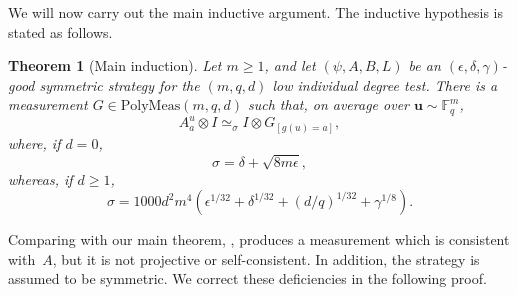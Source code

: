 \documentclass[11pt]{article}
\newtheorem{theorem}{Theorem}[section]
\theoremstyle{definition}
\newcommand{\F}{\mathbb F}
\newcommand{\eps}{\epsilon}
\newcommand{\bu}{\boldsymbol{u}}
\newcommand{\polymeas}[3]{\mathrm{PolyMeas}(#1, #2, #3)}
\begin{document}
We will now carry out the main inductive argument.
The inductive hypothesis is stated as follows.

\begin{theorem}[Main induction]\label{thm:main-induction}
Let $m\geq1$, and let $(\psi,A,B,L)$ be an $(\eps,\delta,\gamma)$-good symmetric strategy
for the $(m,q,d)$ low individual degree test.  There is a measurement
$G\in\polymeas{m}{q}{d}$ such that, on average over
$\bu\sim\F_q^m$,
\[
  A^u_a\otimes I\simeq_{\sigma}I\otimes G_{[g(u)=a]},
\]
where, if $d=0$,
\[
 \sigma=\delta+\sqrt{8m\eps},
\]
whereas, if $d\geq1$,
\[
 \sigma=1000d^2m^4\left(
 \eps^{1/32}+\delta^{1/32}+(d/q)^{1/32}
 +\gamma^{1/8}\right).
\]
\end{theorem}

Comparing with our main theorem, ,
 produces a measurement which is consistent with~$A$,
but it is not projective or self-consistent.
In addition, the strategy is assumed to be symmetric.
We correct these deficiencies in the following proof.
\end{document}
